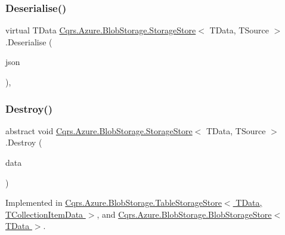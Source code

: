 \subsubsection{\texorpdfstring{Deserialise()}{Deserialise()}\hspace{0.1cm}{\footnotesize\ttfamily [2/2]}}
{\footnotesize\ttfamily virtual T\+Data \hyperlink{classCqrs_1_1Azure_1_1BlobStorage_1_1StorageStore}{Cqrs.\+Azure.\+Blob\+Storage.\+Storage\+Store}$<$ T\+Data, T\+Source $>$.Deserialise (\begin{DoxyParamCaption}\item[{string}]{json }\end{DoxyParamCaption})\hspace{0.3cm}{\ttfamily [protected]}, {\ttfamily [virtual]}}

\mbox{\label{classCqrs_1_1Azure_1_1BlobStorage_1_1StorageStore_a9879b4ab18c2a33d7e20bc0b3a734195}} 
\subsubsection{\texorpdfstring{Destroy()}{Destroy()}}
{\footnotesize\ttfamily abstract void \hyperlink{classCqrs_1_1Azure_1_1BlobStorage_1_1StorageStore}{Cqrs.\+Azure.\+Blob\+Storage.\+Storage\+Store}$<$ T\+Data, T\+Source $>$.Destroy (\begin{DoxyParamCaption}\item[{T\+Data}]{data }\end{DoxyParamCaption})\hspace{0.3cm}{\ttfamily [pure virtual]}}



Implemented in \hyperlink{classCqrs_1_1Azure_1_1BlobStorage_1_1TableStorageStore_a1ad02e710a3fe1d794d99db332c351dc}{Cqrs.\+Azure.\+Blob\+Storage.\+Table\+Storage\+Store$<$ T\+Data, T\+Collection\+Item\+Data $>$}, and \hyperlink{classCqrs_1_1Azure_1_1BlobStorage_1_1BlobStorageStore_a7e4870567b393327563d131cb25151e0}{Cqrs.\+Azure.\+Blob\+Storage.\+Blob\+Storage\+Store$<$ T\+Data $>$}.

\mbox{\label{classCqrs_1_1Azure_1_1BlobStorage_1_1StorageStore_a3fddffcffd2bd3c79212bb6ef2cdc422}} 
